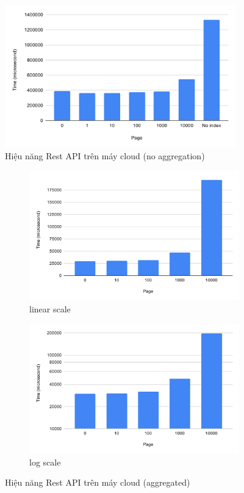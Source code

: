 \begin{figure}[H]
\centering
\includegraphics[width=10cm]{images/testing/view-cloud.png}
\caption{Hiệu năng Rest API trên máy cloud (no aggregation)}
\end{figure}

\begin{figure}[H]
\centering
\begin{subfigure}{0.5\textwidth}
    \centering
    \includegraphics[width=\textwidth]
    {images/testing/view-aggregated-cloud.png}
    \caption{linear scale}
\end{subfigure}%
\begin{subfigure}{0.5\textwidth}
    \centering
    \includegraphics[width=\textwidth]
    {images/testing/view-aggregated-cloud-log.png}
    \caption{log scale}
\end{subfigure}
\caption{Hiệu năng Rest API trên máy cloud (aggregated)}
\end{figure}

